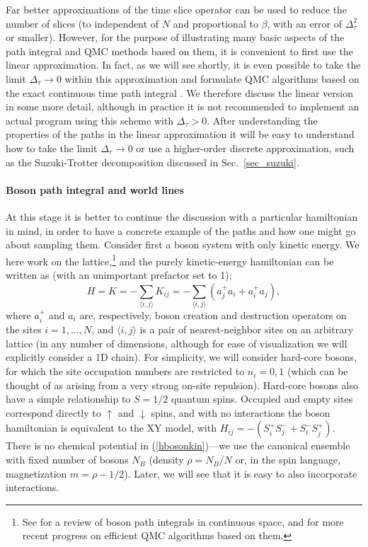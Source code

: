 \documentclass[draft,numberedheadings]{aipproc}
\newcommand{\dn}{\downarrow}
\newcommand{\up}{\uparrow}
\begin{document}
Far better approximations of the time slice operator can be used to reduce the number of slices (to independent of $N$ and proportional to $\beta$, with an 
error of $\Delta_\tau^2$ or smaller). However, for the purpose of illustrating many basic aspects of the path integral and QMC methods based on them, it is 
convenient to first use the linear approximation. In fact, as we will see shortly, it is even possible to take the limit $\Delta_\tau \to 0$ within this 
approximation and formulate QMC algorithms based on the exact continuous time path integral \cite{beard,prokofev96,syljuasen02}. We therefore discuss the 
linear version in some more detail, although in practice it is not recommended to implement an actual program using this scheme with $\Delta_\tau > 0$.  After 
understanding the properties of the paths in the linear approximation it will be easy to understand how to take the limit $\Delta_\tau \to 0$ or use a 
higher-order discrete approximation, such as the Suzuki-Trotter decomposition discussed in Sec.~\ref{sec_suzuki}.

\paragraph{Boson path integral and world lines}

At this stage it is better to continue the discussion with  a particular hamiltonian in mind, in order to have a concrete example of the paths and how 
one might go about sampling them.  Consider first a boson system with only kinetic energy. We here work on the lattice,\footnote{See \cite{ceperley95} 
for a review of boson path integrals in continuous space, and \cite{boninsegni06} for more recent progress on efficient QMC algorithms 
based on them.} and the purely kinetic-energy hamiltonian  can be written as (with an unimportant prefactor set to 1); 
\begin{equation}
H = K = -\sum_{\langle i,j\rangle} K_{ij} = -\sum_{\langle i,j\rangle} (a^+_ja_i + a^+_ia_j),
\label{hbosonkin}
\end{equation}
where $a^+_i$ and $a_i$ are, respectively, boson creation and destruction operators on the sites $i=1,\ldots,N$, and $\langle i,j\rangle$ is a pair of 
nearest-neighbor sites on an arbitrary lattice (in any number of dimensions, although for ease of visualization we will explicitly consider a 1D chain). 
For simplicity, we will consider hard-core bosons, for which the site occupation numbers are restricted to $n_i=0,1$ (which can be thought of as arising from a 
very strong on-site repulsion). Hard-core bosons also have a simple relationship to $S=1/2$ quantum spins. Occupied and empty sites correspond directly to $\up$ 
and $\dn$ spins, and with no interactions the boson hamiltonian is equivalent to the XY model, with $H_{ij}=-(S^+_iS^-_j+S^-_iS^+_j)$. There is no chemical 
potential in (\ref{hbosonkin})---we use the canonical ensemble with fixed number of bosons $N_B$ (density $\rho=N_B/N$ or, in the spin language, magnetization 
$m=\rho-1/2$). Later, we will see that it is easy to also incorporate interactions.
\end{document}
